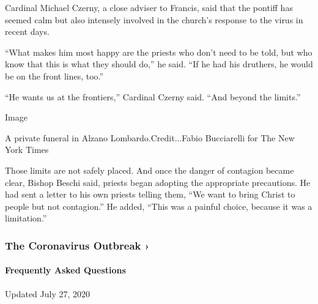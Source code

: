 Cardinal Michael Czerny, a close adviser to Francis, said that the
pontiff has seemed calm but also intensely involved in the church's
response to the virus in recent days.

``What makes him most happy are the priests who don't need to be told,
but who know that this is what they should do,'' he said. ``If he had
his druthers, he would be on the front lines, too.''

``He wants us at the frontiers,'' Cardinal Czerny said. ``And beyond the
limits.''

Image

A private funeral in Alzano Lombardo.Credit...Fabio Bucciarelli for The
New York Times

Those limits are not safely placed. And once the danger of contagion
became clear, Bishop Beschi said, priests began adopting the appropriate
precautions. He had sent a letter to his own priests telling them, ``We
want to bring Christ to people but not contagion.'' He added, ``This was
a painful choice, because it was a limitation.''

\href{https://www.nytimes3xbfgragh.onion/news-event/coronavirus?action=click\&pgtype=Article\&state=default\&region=MAIN_CONTENT_3\&context=storylines_faq}{}

\hypertarget{the-coronavirus-outbreak-}{%
\subsubsection{The Coronavirus Outbreak
›}\label{the-coronavirus-outbreak-}}

\hypertarget{frequently-asked-questions}{%
\paragraph{Frequently Asked
Questions}\label{frequently-asked-questions}}

Updated July 27, 2020

